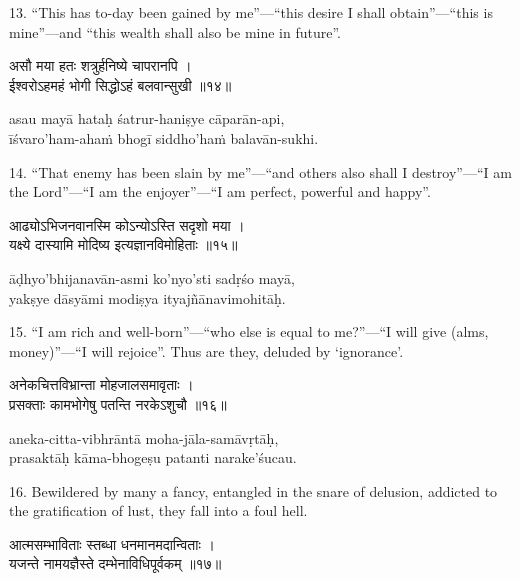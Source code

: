 13. ``This has to-day been gained by me''---``this desire I shall
obtain''---``this is mine''---and ``this wealth shall also be mine in future''.

\begin{gitaverse}
असौ मया हतः शत्रुर्हनिष्ये चापरानपि । \\
ईश्वरोऽहमहं भोगी सिद्धोऽहं बलवान्सुखी ॥१४॥
\end{gitaverse}

\begin{transliteration}
asau mayā hataḥ śatrur-haniṣye cāparān-api, \\
īśvaro'ham-ahaṁ bhogī siddho'haṁ balavān-sukhi.
\end{transliteration}

14. ``That enemy has been slain by me''---``and others also shall I
destroy''---``I am the Lord''---``I am the enjoyer''---``I am perfect, powerful
and happy''.

\begin{gitaverse}
आढ्योऽभिजनवानस्मि कोऽन्योऽस्ति सदृशो मया । \\
यक्ष्ये दास्यामि मोदिष्य इत्यज्ञानविमोहिताः ॥१५॥
\end{gitaverse}

\begin{transliteration}
āḍhyo'bhijanavān-asmi ko'nyo'sti sadṛśo mayā, \\
yakṣye dāsyāmi modiṣya ityajñānavimohitāḥ.
\end{transliteration}

15. ``I am rich and well-born''---``who else is equal to me?''---``I will give
(alms, money)''---``I will rejoice''. Thus are they, deluded by `ignorance'.

\begin{gitaverse}
अनेकचित्तविभ्रान्ता मोहजालसमावृताः । \\
प्रसक्ताः कामभोगेषु पतन्ति नरकेऽशुचौ ॥१६॥
\end{gitaverse}

\begin{transliteration}
aneka-citta-vibhrāntā moha-jāla-samāvṛtāḥ, \\
prasaktāḥ kāma-bhogeṣu patanti narake'śucau.
\end{transliteration}

16. Bewildered by many a fancy, entangled in the snare of delusion, addicted to
the gratification of lust, they fall into a foul hell.

\begin{gitaverse}
आत्मसम्भाविताः स्तब्धा धनमानमदान्विताः । \\
यजन्ते नामयज्ञैस्ते दम्भेनाविधिपूर्वकम् ॥१७॥
\end{gitaverse}


